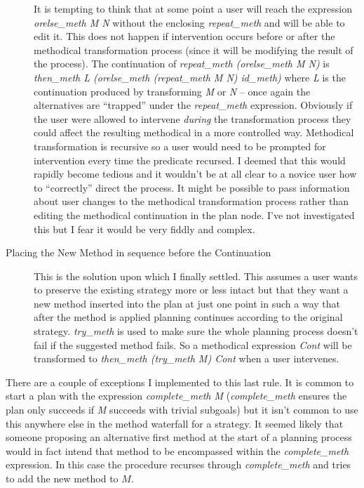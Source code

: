 \begin{description}
It is tempting to think that at some point a user will reach the
expression {\em orelse\_meth M
  N} without the enclosing {\em
  repeat\_meth} and will be able to
edit it.  This does not happen if intervention
occurs before or after the methodical
transformation process (since it will
be modifying the result of the process).  The continuation of {\em
  repeat\_meth (orelse\_meth M N)} is {\em then\_meth L (orelse\_meth
  (repeat\_meth M N) id\_meth)} where {\em L} is the continuation
produced by transforming {\em M} or {\em N} -- once again the
alternatives are ``trapped'' under the {\em repeat\_meth} expression.
Obviously if the user were allowed to intervene {\em during} the
transformation process they could affect the resulting methodical in a
more controlled way.  Methodical transformation is recursive so a user
would need to be prompted for intervention every time the predicate
recursed.  I deemed that this would rapidly become tedious and it
wouldn't be at all clear to a novice user how to ``correctly'' direct
the process.  It might be possible to pass information about user
changes to the methodical transformation process rather than
editing the methodical continuation in the plan
node.  I've not investigated this but I fear it would be very fiddly
and complex.

\item[Placing the New Method in sequence before the Continuation] This 
  is the solution upon which I finally settled.  This assumes a user
  wants to preserve the existing strategy more or less intact but that
  they want a new method inserted into the plan at just one point in such a
  way that after the method is applied planning continues according to 
  the original strategy.  {\em
    try\_meth} is used to make sure the whole
  planning process doesn't  
  fail if the suggested method fails.  So a methodical
  expression {\em  
    Cont} will be transformed to {\em then\_meth (try\_meth M) Cont}
  when a user intervenes.
\end{description}

There are a couple of exceptions I implemented to this last rule.  It
is common to start a plan with the expression {\em complete\_meth
  M} ({\em complete\_meth} ensures the plan only
succeeds if {\em M} succeeds with trivial subgoals) but it isn't
common to use this anywhere else in the method
waterfall for a
strategy.  It seemed likely that someone
proposing an alternative first method at the start of a planning
process would in fact intend that method to be encompassed within the
{\em complete\_meth} expression.  In this case the procedure recurses
through {\em complete\_meth} and tries to add the new method to $M$.

